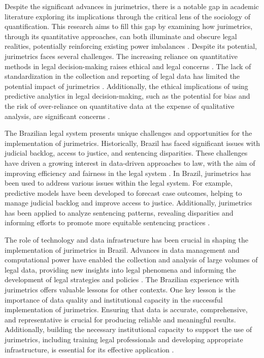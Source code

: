 Despite the significant advances in jurimetrics, there is a notable gap in academic literature exploring its implications through the critical lens of the sociology of quantification. This research aims to fill this gap by examining how jurimetrics, through its quantitative approaches, can both illuminate and obscure legal realities, potentially reinforcing existing power imbalances \cite{10.1057/s41599-020-00557-0,10.1590/data.2022.65.3.267}. Despite its potential, jurimetrics faces several challenges. The increasing reliance on quantitative methods in legal decision-making raises ethical and legal concerns \cite{jurimetricschallenges}. The lack of standardization in the collection and reporting of legal data has limited the potential impact of jurimetrics \cite{jurimetricschallenges}. Additionally, the ethical implications of using predictive analytics in legal decision-making, such as the potential for bias and the risk of over-reliance on quantitative data at the expense of qualitative analysis, are significant concerns \cite{jurimetricschallenges}.

The Brazilian legal system presents unique challenges and opportunities for the implementation of jurimetrics. Historically, Brazil has faced significant issues with judicial backlog, access to justice, and sentencing disparities. These challenges have driven a growing interest in data-driven approaches to law, with the aim of improving efficiency and fairness in the legal system \cite{garcia2020}. In Brazil, jurimetrics has been used to address various issues within the legal system. For example, predictive models have been developed to forecast case outcomes, helping to manage judicial backlog and improve access to justice. Additionally, jurimetrics has been applied to analyze sentencing patterns, revealing disparities and informing efforts to promote more equitable sentencing practices \cite{silva2019}.

The role of technology and data infrastructure has been crucial in shaping the implementation of jurimetrics in Brazil. Advances in data management and computational power have enabled the collection and analysis of large volumes of legal data, providing new insights into legal phenomena and informing the development of legal strategies and policies \cite{martins2021}. The Brazilian experience with jurimetrics offers valuable lessons for other contexts. One key lesson is the importance of data quality and institutional capacity in the successful implementation of jurimetrics. Ensuring that data is accurate, comprehensive, and representative is crucial for producing reliable and meaningful results. Additionally, building the necessary institutional capacity to support the use of jurimetrics, including training legal professionals and developing appropriate infrastructure, is essential for its effective application \cite{ferreira2020}.

